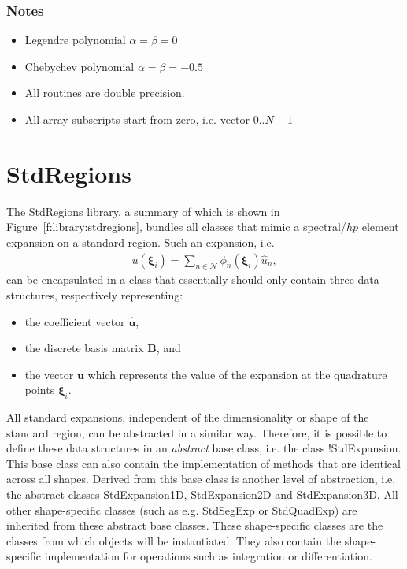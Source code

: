 \subsubsection{Notes}
\begin{itemize}
\setlength{\itemsep}{0em}
\item Legendre polynomial $\alpha = \beta = 0$
\item Chebychev polynomial $\alpha = \beta = -0.5$
\item All routines are double precision.
\item All array subscripts start from zero, i.e. vector $0..N-1$
\end{itemize}



\section{StdRegions}
The StdRegions library, a summary of which is shown in
Figure~\ref{f:library:stdregions}, bundles all classes that mimic a
spectral/$hp$ element expansion on a standard region. Such an expansion, i.e.
\begin{align*}
u(\boldsymbol{\xi}_i) =
  \sum_{n\in\mathcal{N}}\phi_n(\boldsymbol{\xi}_i)\hat{u}_n,
\end{align*}
can be encapsulated in a class that essentially should only contain three data
structures, respectively representing:

\begin{itemize}
\item the coefficient vector $\hat{\boldsymbol{u}}$,
\item the discrete basis matrix $\boldsymbol{B}$, and
\item the vector $\boldsymbol{u}$ which represents the value of the expansion
at the quadrature points $\boldsymbol{\xi}_i$.
\end{itemize}

All standard expansions, independent of the dimensionality or shape of the
standard region, can be abstracted in a similar way. Therefore, it is possible
to define these data structures in an \emph{abstract} base class, i.e. the class
!StdExpansion. This base class can also contain the implementation of methods
that are identical across all shapes. Derived from this base class is another
level of abstraction, i.e. the abstract classes StdExpansion1D, StdExpansion2D
and StdExpansion3D. All other shape-specific classes (such as e.g. StdSegExp or
StdQuadExp) are inherited from these abstract base classes. These shape-specific
classes are the classes from which objects will be instantiated.
They also contain the shape-specific implementation for operations such as
integration or differentiation.

